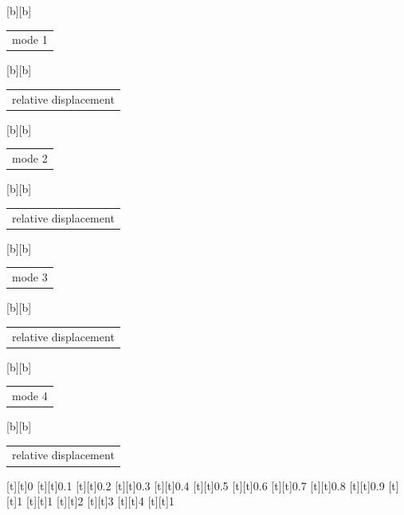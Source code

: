%    
%
%
\begin{psfrags}%
\psfragscanon%
%
[b][b]{\color[rgb]{0,0,0}\setlength{\tabcolsep}{0pt}\begin{tabular}{c}mode 1\end{tabular}}%
[b][b]{\color[rgb]{0,0,0}\setlength{\tabcolsep}{0pt}\begin{tabular}{c}relative displacement\end{tabular}}%
[b][b]{\color[rgb]{0,0,0}\setlength{\tabcolsep}{0pt}\begin{tabular}{c}mode 2\end{tabular}}%
[b][b]{\color[rgb]{0,0,0}\setlength{\tabcolsep}{0pt}\begin{tabular}{c}relative displacement\end{tabular}}%
[b][b]{\color[rgb]{0,0,0}\setlength{\tabcolsep}{0pt}\begin{tabular}{c}mode 3\end{tabular}}%
[b][b]{\color[rgb]{0,0,0}\setlength{\tabcolsep}{0pt}\begin{tabular}{c}relative displacement\end{tabular}}%
[b][b]{\color[rgb]{0,0,0}\setlength{\tabcolsep}{0pt}\begin{tabular}{c}mode 4\end{tabular}}%
[b][b]{\color[rgb]{0,0,0}\setlength{\tabcolsep}{0pt}\begin{tabular}{c}relative displacement\end{tabular}}%
%
[t][t]{0}%
[t][t]{0.1}%
[t][t]{0.2}%
[t][t]{0.3}%
[t][t]{0.4}%
[t][t]{0.5}%
[t][t]{0.6}%
[t][t]{0.7}%
[t][t]{0.8}%
[t][t]{0.9}%
[t][t]{1}%
[t][t]{1}%
[t][t]{2}%
[t][t]{3}%
[t][t]{4}%
[t][t]{1}%

\end{psfrags}
